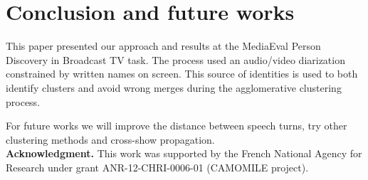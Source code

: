 \documentclass{acm_proc_article-me}
\begin{document}
%
%
%
%
%



\section{Conclusion and future works}

This paper presented our approach and results at the MediaEval Person Discovery in Broadcast TV task. The process used an audio/video diarization constrained by written names on screen.
This source of identities is used to both identify clusters and avoid wrong merges during the agglomerative clustering process.

For future works we will improve the distance between speech turns, try other clustering methods and cross-show propagation. \\


\noindent\textbf{Acknowledgment.} This work was supported by the French National Agency for Research under grant ANR-12-CHRI-0006-01 (CAMOMILE project).

\newpage


\end{document}
